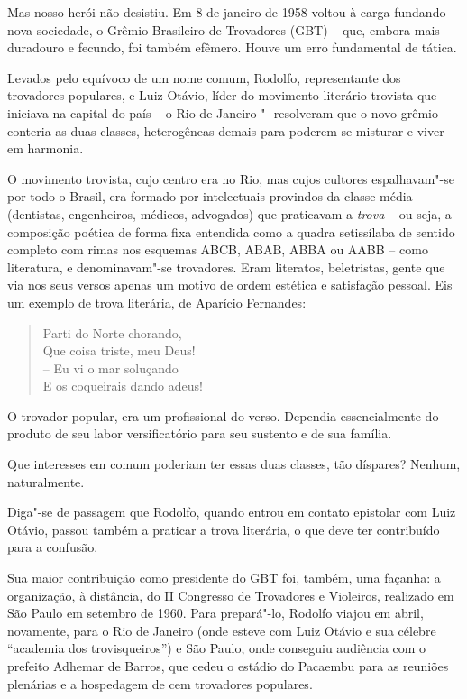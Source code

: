  Mas nosso herói não desistiu. Em 8 de janeiro de 1958 voltou à carga
fundando nova sociedade, o Grêmio Brasileiro de Trovadores (GBT) --
que, embora mais duradouro e fecundo, foi também efêmero. Houve um erro
fundamental de tática. 

 Levados pelo equívoco de um nome comum, Rodolfo, representante dos
trovadores populares, e Luiz Otávio, líder do movimento literário
trovista que iniciava na capital do país -- o Rio de Janeiro "-
resolveram que o novo grêmio conteria as duas classes, heterogêneas
demais para poderem se misturar e viver em harmonia. 

 O movimento trovista, cujo centro era no Rio, mas cujos cultores
espalhavam"-se por todo o Brasil, era formado por intelectuais
provindos da classe média (dentistas, engenheiros, médicos, advogados)
que praticavam a \textit{trova} -- ou seja, a composição poética de
forma fixa entendida como a quadra setissílaba de sentido completo com
rimas nos esquemas ABCB, ABAB, ABBA ou AABB -- como literatura, e
denominavam"-se trovadores. Eram literatos, beletristas, gente que via
nos seus versos apenas um motivo de ordem estética e satisfação
pessoal. Eis um exemplo de trova literária, de Aparício Fernandes: 

 
\begin{verse}
Parti do Norte chorando, \\
Que coisa triste, meu Deus! \\
-- Eu vi o mar soluçando \\
E os coqueirais dando adeus! 
\end{verse}

O trovador popular, era um profissional do verso. Dependia
essencialmente do produto de seu labor versificatório para seu sustento
e de sua família. 

 Que interesses em comum poderiam ter essas duas classes, tão díspares?
Nenhum, naturalmente. 

 Diga"-se de passagem que Rodolfo, quando entrou em contato epistolar
com Luiz Otávio, passou também a praticar a trova literária, o que deve
ter contribuído para a confusão. 

 Sua maior contribuição como presidente do GBT foi, também, uma façanha:
a organização, à distância, do II Congresso de Trovadores e Violeiros,
realizado em São Paulo em setembro de 1960. Para prepará"-lo, Rodolfo
viajou em abril, novamente, para o Rio de Janeiro (onde esteve com Luiz
Otávio e sua célebre ``academia dos
trovisqueiros'') e São Paulo, onde conseguiu audiência com
o prefeito Adhemar de Barros, que cedeu o estádio do Pacaembu para as
reuniões plenárias e a hospedagem de cem trovadores populares. 

